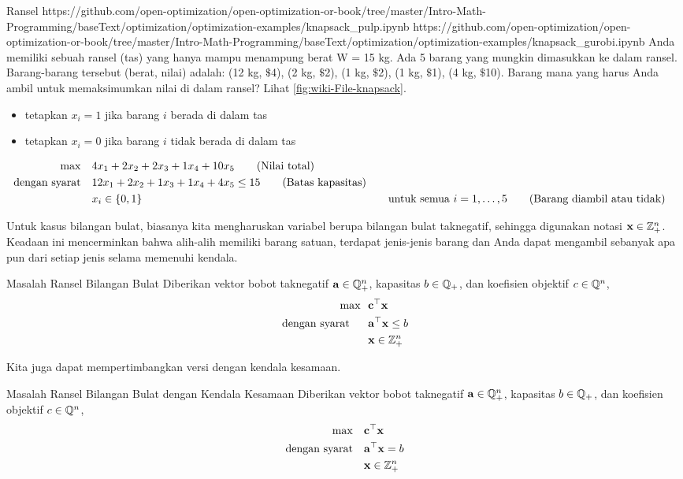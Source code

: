 \begin{examplewithallcode}{Ransel}
{}
{https://github.com/open-optimization/open-optimization-or-book/tree/master/Intro-Math-Programming/baseText/optimization/optimization-examples/knapsack_pulp.ipynb}
{https://github.com/open-optimization/open-optimization-or-book/tree/master/Intro-Math-Programming/baseText/optimization/optimization-examples/knapsack_gurobi.ipynb}
\label{example:knapsack}
Anda memiliki sebuah ransel (tas) yang hanya mampu menampung berat W = 15 kg. Ada 5 barang yang mungkin dimasukkan ke dalam ransel. Barang-barang tersebut (berat, nilai) adalah:
(12 kg, $\$$4), (2 kg, $\$$2), (1 kg, $\$$2), (1 kg, $\$$1), (4 kg, $\$$10). Barang mana yang harus Anda ambil untuk memaksimumkan nilai di dalam ransel? Lihat \autoref{fig:wiki-File-knapsack}.\\

\begin{itemize}
\item tetapkan $x_i = 1$ jika barang $i$ berada di dalam tas
\item tetapkan $x_i = 0$ jika barang $i$ tidak berada di dalam tas
\end{itemize}
\begin{align}
\max \quad & 4 x_1 + 2 x_2 + 2 x_3 + 1 x_4 + 10 x_5   \tag{Nilai total} \\
\mbox{dengan syarat}\quad        & 12 x_1 + 2 x_2 + 1 x_3 + 1 x_4 + 4 x_5 \leq 15   \tag{Batas kapasitas} \\
& x_i \in \{0,1\} &&\quad \mbox{untuk semua } i=1, \dots, 5   \tag{Barang diambil atau tidak}
\end{align}
\end{examplewithallcode}
Untuk kasus bilangan bulat, biasanya kita mengharuskan variabel berupa bilangan bulat taknegatif, sehingga digunakan notasi $\mathbf{x} \in {\mathbb{Z}}^n_+$. Keadaan ini mencerminkan bahwa alih-alih memiliki barang satuan, terdapat jenis-jenis barang dan Anda dapat mengambil sebanyak apa pun dari setiap jenis selama memenuhi kendala.
\begin{general}{Masalah Ransel Bilangan Bulat}{\npcomplete}
Diberikan vektor bobot taknegatif $\mathbf{a} \in {\mathbb{Q}}^n_+$, kapasitas $b \in {\mathbb{Q}}_+$, dan koefisien objektif $c \in {\mathbb{Q}}^n$,
\begin{equation}
\begin{split}
\max \ \ & \mathbf{c}^\top \mathbf{x}\\
\mbox{dengan syarat}\quad \ \ & \mathbf{a}^\top \mathbf{x} \leq b\\
& \mathbf{x} \in {\mathbb{Z}}^n_+
\end{split}
\end{equation}
\end{general}
Kita juga dapat mempertimbangkan versi dengan kendala kesamaan.
\begin{general}{Masalah Ransel Bilangan Bulat dengan Kendala Kesamaan}{\nphard}
Diberikan vektor bobot taknegatif $\mathbf{a} \in {\mathbb{Q}}^n_+$, kapasitas $b \in {\mathbb{Q}}_+$, dan koefisien objektif $c \in {\mathbb{Q}}^n$,
\begin{align}
\max \quad & \mathbf{c}^\top \mathbf{x} \\
\mbox{dengan syarat}\quad        & \mathbf{a}^\top \mathbf{x} = b \\
& \mathbf{x} \in {\mathbb{Z}}^n_+
\end{align}
\end{general}



